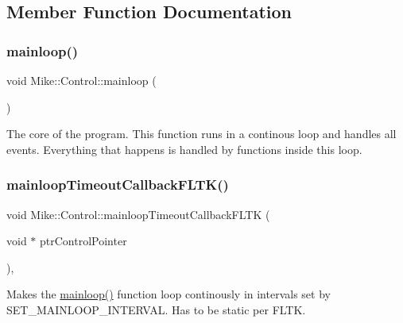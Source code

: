\subsection{Member Function Documentation}
\mbox{\label{class_mike_1_1_control_a3440083f03f7da3d4490fa44bc13d62b}} 
\subsubsection{\texorpdfstring{mainloop()}{mainloop()}}
{\footnotesize\ttfamily void Mike\+::\+Control\+::mainloop (\begin{DoxyParamCaption}{ }\end{DoxyParamCaption})\hspace{0.3cm}{\ttfamily [private]}}

The core of the program. This function runs in a continous loop and handles all events. Everything that happens is handled by functions inside this loop. \mbox{\label{class_mike_1_1_control_ac627d3cc73f39181fbfabfa01eb47f85}} 
\subsubsection{\texorpdfstring{mainloop\+Timeout\+Callback\+F\+L\+T\+K()}{mainloopTimeoutCallbackFLTK()}}
{\footnotesize\ttfamily void Mike\+::\+Control\+::mainloop\+Timeout\+Callback\+F\+L\+TK (\begin{DoxyParamCaption}\item[{void $\ast$}]{ptr\+Control\+Pointer }\end{DoxyParamCaption})\hspace{0.3cm}{\ttfamily [static]}, {\ttfamily [private]}}

Makes the \hyperlink{class_mike_1_1_control_a3440083f03f7da3d4490fa44bc13d62b}{mainloop()} function loop continously in intervals set by S\+E\+T\+\_\+\+M\+A\+I\+N\+L\+O\+O\+P\+\_\+\+I\+N\+T\+E\+R\+V\+AL. Has to be static per F\+L\+TK. \mbox{\label{class_mike_1_1_control_a2f239c6bace6fba6d31d54919b7ee6e1}} 
